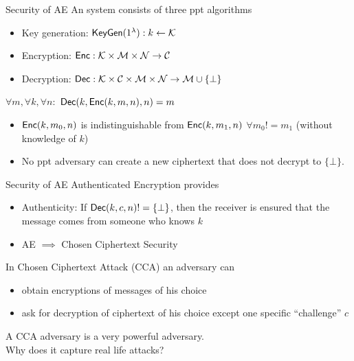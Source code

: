 \documentclass[usenames,dvipsnames, 9pt]{beamer}
\begin{document}
\begin{frame}{Security of AE}
\Large
An { \color{Orange}{Authenticated Encryption (AE)}} system consists of three ppt algorithms
\begin{itemize}
	\itemsep 10pt
	\item Key generation: $\textsf{KeyGen}(1^\lambda): k \leftarrow \mathcal{K}$
	\item Encryption: $\textsf{Enc}: \mathcal{K} \times \mathcal{M} \times \mathcal{N} \rightarrow \mathcal{C}$
	\item Decryption:  $\textsf{Dec}: \mathcal{K} \times \mathcal{C} \times \mathcal{M} \times \mathcal{N} \rightarrow \mathcal{M} \cup \{\bot\}$
\end{itemize}

\vspace{15pt}
{\color{Orange}{Correctness:}} $\forall m, \forall k, \forall n:$ $\textsf{Dec}(k, \textsf{Enc}(k, m,n), n) = m$
\pause
\vspace{15pt}
{\color{Orange}{Security:}}
\begin{itemize}
	\itemsep 10pt
	\item $\textsf{Enc}(k, m_0, n)$ is indistinguishable from $\textsf{Enc}(k, m_1, n)$ $\forall m_0 != m_1$ (without knowledge of $k$) 
	\item No ppt adversary can create a new ciphertext that does not decrypt to $\{\bot\}$.
\end{itemize}

\end{frame}

\begin{frame}{Security of AE}
	\Large
	Authenticated Encryption provides
	\begin{itemize}
		\itemsep 10pt
		\item {\color{Orange}Authenticity:} If $\textsf{Dec}(k, c, n)!=\{\bot\}$, then the receiver is ensured that the message comes from someone who knows $k$
		\pause
		\item {\color{Orange}AE $\implies$ Chosen Ciphertext Security} 
	\end{itemize}
\pause
\vspace{15pt}
In Chosen Ciphertext Attack (CCA) an adversary can
\begin{itemize}
	\item obtain encryptions of messages of his choice
	\item ask for decryption of {\color{Orange}{any}} ciphertext of his choice except one specific ``challenge'' $c$
\end{itemize}
\vfill
\centering
\color{Orange} A CCA adversary is a very powerful adversary. \\
Why does it capture real life attacks?
\end{frame}
\end{document}
